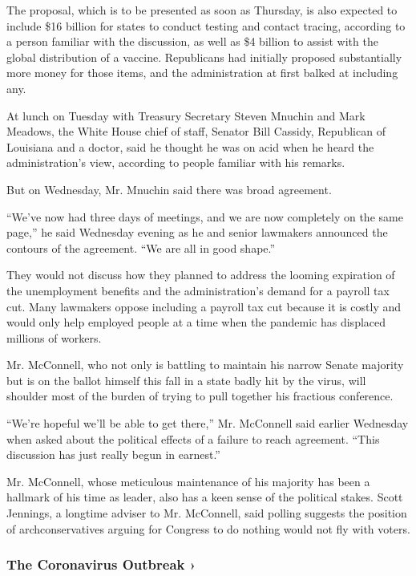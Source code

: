 The proposal, which is to be presented as soon as Thursday, is also
expected to include \$16 billion for states to conduct testing and
contact tracing, according to a person familiar with the discussion, as
well as \$4 billion to assist with the global distribution of a vaccine.
Republicans had initially proposed substantially more money for those
items, and the administration at first balked at including any.

At lunch on Tuesday with Treasury Secretary Steven Mnuchin and Mark
Meadows, the White House chief of staff, Senator Bill Cassidy,
Republican of Louisiana and a doctor, said he thought he was on acid
when he heard the administration's view, according to people familiar
with his remarks.

But on Wednesday, Mr. Mnuchin said there was broad agreement.

``We've now had three days of meetings, and we are now completely on the
same page,'' he said Wednesday evening as he and senior lawmakers
announced the contours of the agreement. ``We are all in good shape.''

They would not discuss how they planned to address the looming
expiration of the unemployment benefits and the administration's demand
for a payroll tax cut. Many lawmakers oppose including a payroll tax cut
because it is costly and would only help employed people at a time when
the pandemic has displaced millions of workers.

Mr. McConnell, who not only is battling to maintain his narrow Senate
majority but is on the ballot himself this fall in a state badly hit by
the virus, will shoulder most of the burden of trying to pull together
his fractious conference.

``We're hopeful we'll be able to get there,'' Mr. McConnell said earlier
Wednesday when asked about the political effects of a failure to reach
agreement. ``This discussion has just really begun in earnest.''

Mr. McConnell, whose meticulous maintenance of his majority has been a
hallmark of his time as leader, also has a keen sense of the political
stakes. Scott Jennings, a longtime adviser to Mr. McConnell, said
polling suggests the position of archconservatives arguing for Congress
to do nothing would not fly with voters.

\href{https://www.nytimes.com/news-event/coronavirus?action=click\&pgtype=Article\&state=default\&region=MAIN_CONTENT_3\&context=storylines_faq}{}

\hypertarget{the-coronavirus-outbreak-}{%
\subsubsection{The Coronavirus Outbreak
›}\label{the-coronavirus-outbreak-}}

